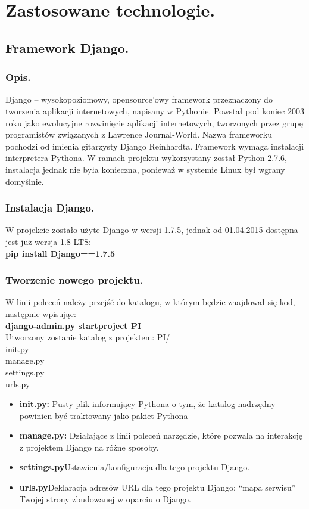 \documentclass[a4paper,12pt]{article}		%
\begin{document}
\section{Zastosowane technologie.}

\subsection{Framework Django.}

\subsubsection{Opis.}
Django – wysokopoziomowy, opensource’owy framework przeznaczony do tworzenia aplikacji internetowych, napisany w Pythonie. Powstał pod koniec 2003 roku jako ewolucyjne rozwinięcie aplikacji internetowych, tworzonych przez grupę programistów związanych z Lawrence Journal-World. Nazwa frameworku pochodzi od imienia gitarzysty Django Reinhardta.
Framework wymaga instalacji interpretera Pythona. W ramach projektu wykorzystany został Python 2.7.6, instalacja jednak nie była konieczna, ponieważ w systemie Linux był wgrany domyślnie.

\subsubsection{Instalacja Django.}
W projekcie zostało użyte Django w wersji 1.7.5, jednak od 01.04.2015 dostępna jest już wersja 1.8 LTS:\\
\textbf{pip install Django==1.7.5}

\subsubsection{Tworzenie nowego projektu.}
W linii poleceń należy przejść do katalogu, w którym będzie znajdował się kod, następnie wpisując:\\
\textbf{django-admin.py startproject PI}\\
Utworzony zostanie katalog z projektem:
PI/\\
init.py\\
manage.py\\
settings.py\\
urls.py

\begin{itemize}
\item \textbf{init.py: }Pusty plik informujący Pythona o tym, że katalog nadrzędny powinien być traktowany jako pakiet Pythona 
\item \textbf{manage.py: }Działające z linii poleceń narzędzie, które pozwala na interakcję z projektem Django na różne sposoby.
\item \textbf{settings.py}Ustawienia/konfiguracja dla tego projektu Django.
\item \textbf{urls.py}Deklaracja adresów URL dla tego projektu Django; “mapa serwisu” Twojej strony zbudowanej w oparciu o Django.
\end{itemize}
\end{document}
